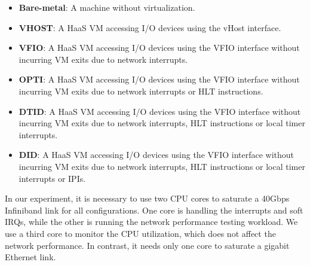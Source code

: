 \begin{itemize}
\parskip 0mm
\itemsep 0mm
\item {\bf Bare-metal}: A machine without virtualization.

\item {\bf VHOST}: A HaaS VM accessing I/O devices using the
                   vHost interface.

\item {\bf VFIO}: A HaaS VM accessing I/O devices using the
                  VFIO interface without incurring VM exits
                  due to network interrupts.

\item {\bf OPTI}: A HaaS VM accessing I/O devices using the
                  VFIO interface without incurring VM exits
                  due to network interrupts or HLT
                  instructions.

\item{\bf  DTID}: A HaaS VM accessing I/O devices using the
                  VFIO interface without incurring VM exits
                  due to network interrupts, HLT instructions
                  or local timer interrupts.

\item{\bf  DID}: A HaaS VM accessing I/O devices using the
                 VFIO interface without incurring VM exits due
                 to network interrupts, HLT instructions or
                 local timer interrupts or IPIs.
\end{itemize}




In our experiment, it is necessary to use two CPU cores to
saturate a 40Gbps Infiniband link for all configurations. One
core is handling the interrupts and soft IRQs, while the other
is running the network performance testing workload. We use a third
core to monitor the CPU utilization, which does not
affect the network performance. In contrast, it needs only one
core to saturate a gigabit Ethernet link.
